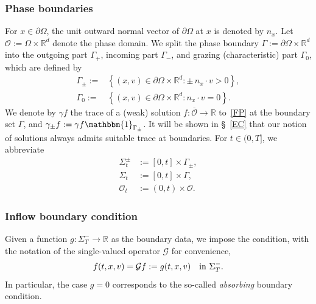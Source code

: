 \documentclass[AHL,Unicode,longabstracts,published]{cedram}
\newcommand*\p{\partial}
\newcommand*\R {\mathbb{R}}
\newcommand*\Gi {\mathcal{G}}
\newcommand*\OO {\mathcal{O}}
\begin{document}
\subsubsection{Phase boundaries} 
For $x\in\p\Omega$, the unit outward normal vector of $\p\Omega$ at $x$ is denoted by $n_x$. Let $\OO:=\Omega\times\R^d$ denote the phase domain. We split the phase boundary $\Gamma:=\p\Omega\times\R^d$ into the outgoing part $\Gamma_+$, incoming part $\Gamma_-$, and grazing (characteristic) part $\Gamma_0$, which are defined by
\begin{align*}
\Gamma_\pm:=& \left\{(x,v)\in\p\Omega\times\R^d : \pm\, n_x\cdot v >0\right\},\\
\Gamma_0:=& \left\{(x,v)\in\p\Omega\times\R^d : n_x\cdot v =0\right\}.
\end{align*}
We denote by $\gamma f$ the trace of a (weak) solution $f:\overline{\OO}\rightarrow\R$ to~\eqref{FP} at the boundary set $\Gamma$, and $\gamma_\pm f:=\gamma f\mathbbm{1}_{\Gamma_\pm}$. It will be shown in \S~\ref{EC} that our notion of solutions always admits suitable trace at boundaries. For $t\in(0,T]$, we abbreviate
\begin{align*}
\Sigma_t^\pm&:=[0,t]\times\Gamma_\pm, \\
\Sigma_t&:=[0,t]\times\Gamma, \\
\OO_t&:=(0,t)\times\OO.
\end{align*}

\subsubsection{Inflow boundary condition} 
Given a function $g:\Sigma_T^-\rightarrow\R$ as the boundary data, we impose the condition, with the notation of the single-valued operator $\Gi$ for convenience,
\begin{align*}
f(t,x,v)=\Gi f:=g(t,x,v) {\quad\rm in\ }\Sigma_T^-.
\end{align*}
In particular, the case $g=0$ corresponds to the so-called \emph{absorbing} boundary condition.
\end{document}
